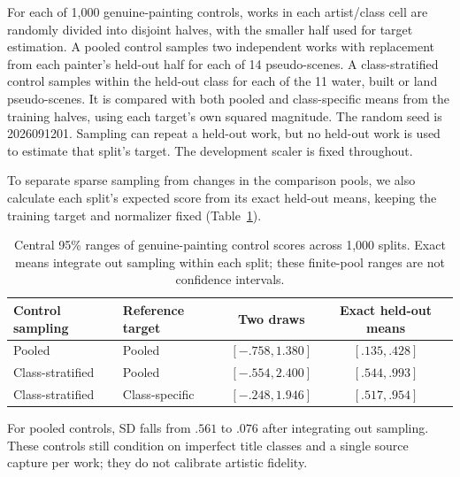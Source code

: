 For each of 1,000 genuine-painting controls, works in each artist/class cell
are randomly divided into disjoint halves, with the smaller half used for
target estimation. A pooled control samples two independent works with replacement
from each painter's held-out half for each of 14 pseudo-scenes. A class-stratified
control samples within the held-out class for each of the 11 water, built or
land pseudo-scenes. It is compared with both pooled and class-specific means
from the training halves, using each target's own squared magnitude.
The random seed is 2026091201. Sampling can repeat a held-out work, but no
held-out work is used to estimate that split's target. The development scaler
is fixed throughout.

To separate sparse sampling from changes in the comparison pools, we also
calculate each split's expected score from its exact held-out means, keeping
the training target and normalizer fixed (Table~\ref{tab:painting-control-ranges}).

\begin{table}[htbp]
\caption{Central 95\% ranges of genuine-painting control scores across 1,000
splits. Exact means integrate out sampling within each split; these finite-pool
ranges are not confidence intervals.}
\label{tab:painting-control-ranges}

\centering\small
\begin{tabular}{llcc}
\toprule
Control sampling & Reference target & Two draws & Exact held-out means\\
\midrule
Pooled & Pooled & $[-.758,1.380]$ & $[.135,.428]$\\
Class-stratified & Pooled & $[-.554,2.400]$ & $[.544,.993]$\\
Class-stratified & Class-specific & $[-.248,1.946]$ & $[.517,.954]$\\
\bottomrule
\end{tabular}


\end{table}

For pooled controls, SD falls from $.561$ to $.076$ after integrating out
sampling. These controls still condition on imperfect title classes and a
single source capture per work; they do not calibrate artistic fidelity.

